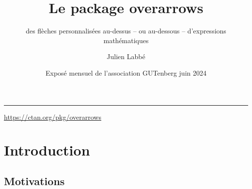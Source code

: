 \documentclass[10pt, aspectratio=3218]{beamer}
\title{Le package overarrows}
\subtitle{des flèches personnalisées au-dessus -- ou au-dessous -- d'expressions mathématiques}
\author{Julien Labbé}
\institute[UGA]{Université Grenoble-Alpes}
\date{Exposé mensuel de l'association GUTenberg\linebreak 6 juin 2024}
\begin{document}
\begingroup
  \begin{frame}
    \hspace*{.5\beamersidebarwidth}
    \begin{minipage}{\textwidth}
      \maketitle

      \begin{center}
        \rule{6cm}{0.4pt}

        \url{https://ctan.org/pkg/overarrows}
      \end{center}
      \vspace*{6pt}%

      \shortinlinetoc
    \end{minipage}
  \end{frame}
\endgroup



\section{Introduction}

\subsection{Motivations}
\end{document}
